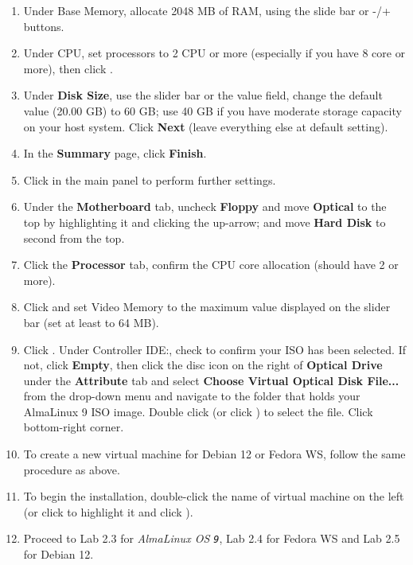 \begin{enumerate}
\item Under Base Memory, allocate 2048 MB of RAM, using the slide bar or -/+ buttons.
\item Under CPU, set processors to 2 CPU or more (especially if you have 8 core or more), then click {}. 
\item Under {\bf{Disk Size}}, use the slider bar or the value field, change the default value (20.00 GB) to 60 GB; use 40 GB if you have moderate storage capacity on your host system. Click {\bf{Next}} (leave everything else at default setting).   
\item In the {\bf{Summary}} page, click {\bf{Finish}}. 
\item Click {} in the main panel to perform further settings.
\item Under the {\bf{Motherboard}} tab, uncheck {\bf{Floppy}} and move {\bf{Optical}} to the top by highlighting it and clicking the up-arrow; and move {\bf{Hard Disk}} to second from the top. 
\item Click the {\bf{Processor}} tab, confirm the CPU core allocation (should have 2 or more). 
\item Click {} and set Video Memory to the maximum value displayed on the slider bar (set at least to 64 MB). 
\item Click {}. Under Controller IDE:, check to confirm your ISO has been selected. If not, click {\bf{Empty}}, then click the disc icon on the right of {\bf{Optical Drive}} under the {\bf{Attribute}} tab and select {\bf{Choose Virtual Optical Disk File...}} from the drop-down menu and navigate to the folder that holds your AlmaLinux 9 ISO image. Double click (or click {}) to select the file. Click {} bottom-right corner. 

\item To create a new virtual machine for Debian 12 or Fedora WS, follow the same procedure as above. 
\item To begin the installation, double-click the name of virtual machine on the left (or click to highlight it and click {}). 
\item Proceed to Lab 2.3 for {\it{AlmaLinux OS {\tt{9}}}}, Lab 2.4 for Fedora WS and Lab 2.5 for Debian 12. 
\end{enumerate}

